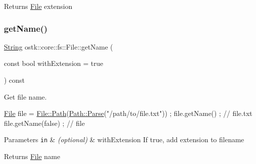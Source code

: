 \begin{DoxyReturn}{Returns}
\hyperlink{classostk_1_1core_1_1fs_1_1_file}{File} extension 
\end{DoxyReturn}
\mbox{\label{classostk_1_1core_1_1fs_1_1_file_ac3120c49b69a93fa364dba012a0d507a}} 
\subsubsection{\texorpdfstring{get\+Name()}{getName()}}
{\footnotesize\ttfamily \hyperlink{classostk_1_1core_1_1types_1_1_string}{String} ostk\+::core\+::fs\+::\+File\+::get\+Name (\begin{DoxyParamCaption}\item[{const bool}]{with\+Extension = {\ttfamily true} }\end{DoxyParamCaption}) const}



Get file name. 


\begin{DoxyCode}
\hyperlink{classostk_1_1core_1_1fs_1_1_file_ad1695224996950be9962b8457da369b3}{File} file = \hyperlink{classostk_1_1core_1_1fs_1_1_file_ad677c6a3edc1e88c18226edebff1da03}{File::Path}(\hyperlink{classostk_1_1core_1_1fs_1_1_path_ad08539ba654f5df11c4bcb07276345ad}{Path::Parse}(\textcolor{stringliteral}{"/path/to/file.txt"})) ;
file.getName() ; \textcolor{comment}{// file.txt}
file.getName(\textcolor{keyword}{false}) ; \textcolor{comment}{// file}
\end{DoxyCode}



\begin{DoxyParams}[1]{Parameters}
\mbox{\tt in}  & {\em (optional)} & with\+Extension If true, add extension to filename \\
\hline
\end{DoxyParams}
\begin{DoxyReturn}{Returns}
\hyperlink{classostk_1_1core_1_1fs_1_1_file}{File} name 
\end{DoxyReturn}
\mbox{\label{classostk_1_1core_1_1fs_1_1_file_a90626395dbeab369d76255556600c7cc}} 
